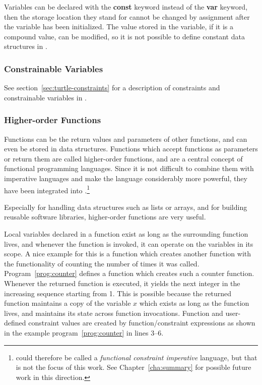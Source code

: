 Variables can be declared with the {\bf const} keyword instead of the
{\bf var} keyword, then the storage location they stand for cannot be
changed by assignment after the variable has been initialized.  The
value stored in the variable, if it is a compound value, can be
modified, so it is not possible to define constant data structures in
\turtle{}.

\subsubsection{Constrainable Variables}

See section~\ref{sec:turtle-constraints} for a description of
constraints and constrainable variables in \turtle{}.


\subsubsection{Higher-order Functions}

Functions can be the return values and parameters of other functions,
and can even be stored in data structures.  Functions which accept
functions as parameters or return them are called higher-order
functions, and are a central concept of functional programming
languages.  Since it is not difficult to combine them with imperative
languages and make the language considerably more powerful, they have
been integrated into \turtle{}.\footnote{\turtle{} could therefore be
  called a {\em functional constraint imperative}
%
language, but that is not the focus of this work.  See
Chapter~\ref{cha:summary} for possible future work in this direction.}

Especially for handling data structures such as lists or arrays, and
for building reusable software libraries, higher-order functions are
very useful.

Local variables declared in a function exist as long as the
surrounding function lives, and whenever the function is invoked, it
can operate on the variables in its scope.  A nice example for this is
a function which creates another function with the functionality of
counting the number of times it was called.
Program~\ref{prog:counter} defines a function which creates such a
counter function.  Whenever the returned function is executed, it
yields the next integer in the increasing sequence starting from 1.
This is possible because the returned function maintains a copy of the
variable $x$ which exists as long as the function lives, and maintains
its state across function invocations.  Function and user-defined
constraint values are created by function/constraint expressions as
shown in the example program~\ref{prog:counter} in lines 3--6.

